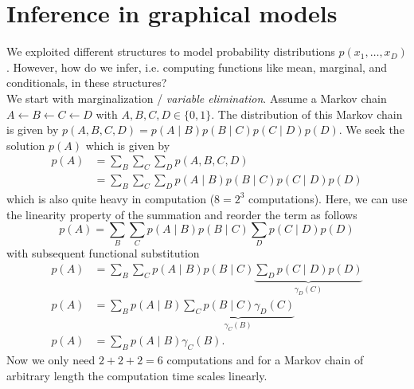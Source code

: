 \section{Inference in graphical models}
We exploited different structures to model probability distributions \ensuremath{p(x_1,\ldots,x_D)}. %
However, how do we infer, i.e. computing functions like mean, marginal, and conditionals, in these structures? %
%
%
%
\\[.1cm]%
We start with marginalization / \emph{variable elimination}. %
Assume a Markov chain \ensuremath{A \leftarrow B \leftarrow C \leftarrow D} with \ensuremath{A,B,C,D\in\{0,1\}}. %
The distribution of this Markov chain is given by \ensuremath{p(A,B,C,D) = p(A\mid B) p(B\mid C) p(C\mid D) p(D)}. %
We seek the solution \ensuremath{p(A)} which is given by %
\begin{equation}
\begin{aligned}
p(A) &= \sum_B \sum_C \sum_D p(A,B,C,D)\\
	 &= \sum_B \sum_C \sum_D p(A\mid B) p(B\mid C) p(C\mid D) p(D)
\end{aligned}
\end{equation}
which is also quite heavy in computation (\ensuremath{8 = 2^3} computations). %
Here, we can use the linearity property of the summation and reorder the term as follows %
\begin{equation}
p(A) = \sum_B \sum_C p(A\mid B) p(B\mid C) \sum_D p(C\mid D) p(D)
\end{equation}
with subsequent functional substitution %
\begin{equation}
\begin{aligned}
p(A) &= \sum_B \sum_C p(A\mid B) p(B\mid C) \underbrace{\sum_D p(C\mid D) p(D)}_{\gamma_D(C)} \\
p(A) &= \sum_B p(A\mid B) \underbrace{\sum_C p(B\mid C) \gamma_D(C)}_{\gamma_C(B)} \\
p(A) &= \sum_B p(A\mid B) \gamma_C(B).
\end{aligned}
\end{equation}
Now we only need \ensuremath{2+2+2 = 6} computations and for a Markov chain of arbitrary length the computation time scales linearly. %
%
%
%
